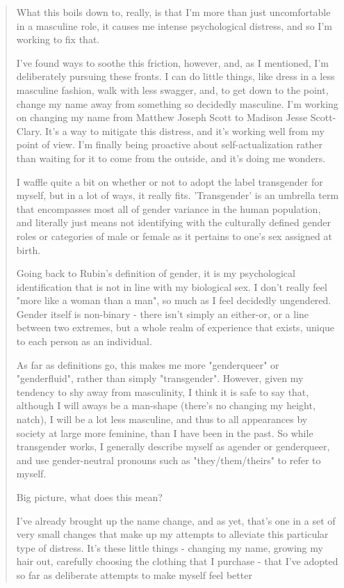 \begin{paracol}{2}
\begin{leftcolumn}
\begin{quotation}
What this boils down to, really, is that I'm more than just uncomfortable in a masculine role, it causes me intense psychological distress, and so I'm working to fix that.

I've found ways to soothe this friction, however, and, as I mentioned, I'm deliberately pursuing these fronts.  I can do little things, like dress in a less masculine fashion, walk with less swagger, and, to get down to the point, change my name away from something so decidedly masculine.  I'm working on changing my name from Matthew Joseph Scott to Madison Jesse Scott-Clary. It's a way to mitigate this distress, and it's working well from my point of view.  I'm finally being proactive about self-actualization rather than waiting for it to come from the outside, and it's doing me wonders.

I waffle quite a bit on whether or not to adopt the label transgender for myself, but in a lot of ways, it really fits.  'Transgender' is an umbrella term that encompasses most all of gender variance in the human population, and literally just means not identifying with the culturally defined gender roles or categories of male or female as it pertains to one's sex assigned at birth.

Going back to Rubin's definition of gender, it is my psychological identification that is not in line with my biological sex.  I don't really feel "more like a woman than a man", so much as I feel decidedly ungendered.  Gender itself is non-binary - there isn't simply an either-or, or a line between two extremes, but a whole realm of experience that exists, unique to each person as an individual.

As far as definitions go, this makes me more "genderqueer" or "genderfluid", rather than simply "transgender".  However, given my tendency to shy away from masculinity, I think it is safe to say that, although I will aways be a man-shape (there's no changing my height, natch), I will be a lot less masculine, and thus to all appearances by society at large more feminine, than I have been in the past.  So while transgender works, I generally describe myself as agender or genderqueer, and use gender-neutral pronouns such as "they/them/theirs" to refer to myself.

Big picture, what does this mean?

I've already brought up the name change, and as yet, that's one in a set of very small changes that make up my attempts to alleviate this particular type of distress.  It's these little things - changing my name, growing my hair out, carefully choosing the clothing that I purchase - that I've adopted so far as deliberate attempts to make myself feel better


\end{quotation}
\end{leftcolumn}
\end{paracol}
